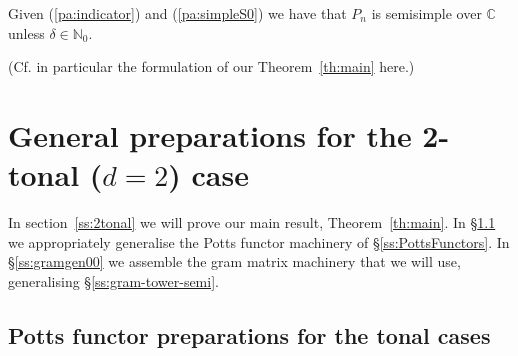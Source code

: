 \documentclass[reqno,10pt,a4paper]{amsart}
\newcommand{\C}{\mathbb{C}}
\newcommand{\N}{\mathbb{N}}
\newcommand{\red}[1]{\textcolor{red}{#1}}
\newcommand{\ppm}[1]{\red{#1}}
\begin{document}
\medskip 


%

\mdef 
Given (\ref{pa:indicator}) and (\ref{pa:simpleS0}) we have that $P_n$ is semisimple over $\C$
unless $\delta \in \N_0$. 


\noindent 
(Cf. in particular the formulation of our Theorem~\ref{th:main} here.)






%
%





%
%


\medskip 



\section{General preparations for the 2-tonal ($d=2$) case}
\label{ss:maintheo}

In  section~\ref{ss:2tonal} we will prove our main 
result, 
Theorem~\ref{th:main}.
%
In \S\ref{ss:tonal-prep} we 
appropriately 
generalise the Potts functor machinery of \S\ref{ss:PottsFunctors}.
In \S\ref{ss:gramgen00} we assemble the gram matrix machinery that we will use,
generalising \S\ref{ss:gram-tower-semi}. 



\subsection{Potts functor preparations for the tonal cases}  \label{ss:tonal-prep}  $\;$ 
\end{document}
